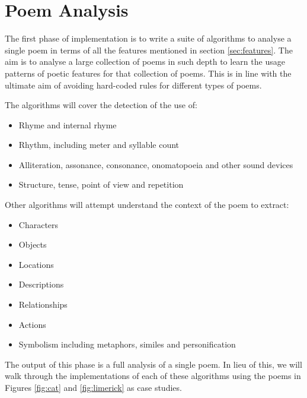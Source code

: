 \def\baselinestretch{1}
\chapter{Poem Analysis}
\ifpdf
    \graphicspath{{Theory/TheoryFigs/PNG/}{Theory/TheoryFigs/PDF/}{Theory/TheoryFigs/}}
\else
    \graphicspath{{Theory/TheoryFigs/EPS/}{Theory/TheoryFigs/}}
\fi

\def\baselinestretch{1.66}

The first phase of implementation is to write a suite of algorithms to analyse a single poem in terms of all the features mentioned in section \ref{sec:features}. The aim is to analyse a large collection of poems in such depth to learn the usage patterns of poetic features for that collection of poems. This is in line with the ultimate aim of avoiding hard-coded rules for different types of poems.

The algorithms will cover the detection of the use of:
\begin{itemize}
\setlength{\itemsep}{0pt}
\item{Rhyme and internal rhyme}
\item{Rhythm, including meter and syllable count}
\item{Alliteration, assonance, consonance, onomatopoeia and other sound devices}
\item{Structure, tense, point of view and repetition}
\end{itemize}

Other algorithms will attempt understand the context of the poem to extract:
\begin{itemize}
\setlength{\itemsep}{0pt}
\item{Characters}
\item{Objects}
\item{Locations}
\item{Descriptions}
\item{Relationships}
\item{Actions}
\item{Symbolism including metaphors, similes and personification}
\end{itemize}

The output of this phase is a full analysis of a single poem. In lieu of this, we will walk through the implementations of each of these algorithms using the poems in Figures \ref{fig:cat} and \ref{fig:limerick} as case studies.


